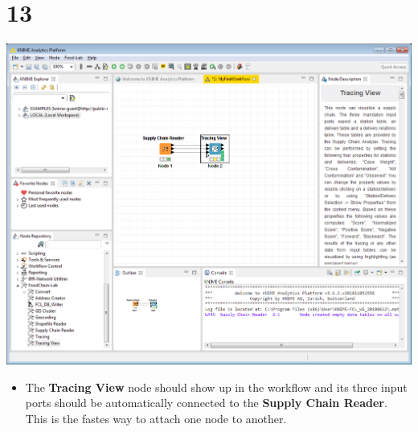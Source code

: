 \documentclass[10pt]{beamer}
\begin{document}
\section{13}
\begin{frame}
	\begin{center}
  		\includegraphics[height=0.6\textheight]{13.png}
	\end{center}
	\begin{itemize}
		\item The \textbf{Tracing View} node should show up in the workflow and its three input ports should be automatically connected to the \textbf{Supply Chain Reader}. This is the fastes way to attach one node to another.
	\end{itemize}
\end{frame}
\end{document}
